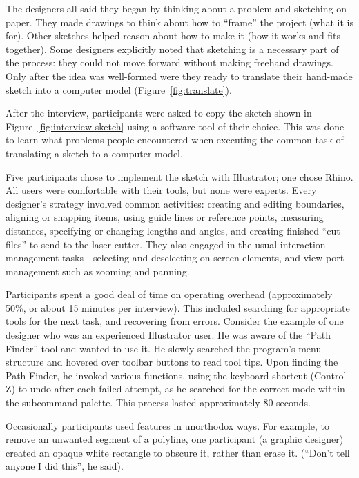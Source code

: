 The designers all said they began by thinking about a problem and
sketching on paper. They made drawings to think about how to ``frame''
the project (what it is for). Other sketches helped reason about how
to make it (how it works and fits together). Some designers explicitly
noted that sketching is a necessary part of the process: they could
not move forward without making freehand drawings. Only after the idea
was well-formed were they ready to translate their hand-made sketch
into a computer model (Figure~\ref{fig:translate}).

After the interview, participants were asked to copy the sketch shown
in Figure~\ref{fig:interview-sketch} using a software tool of their
choice. This was done to learn what problems people encountered when
executing the common task of translating a sketch to a computer model.



Five participants chose to implement the sketch with Illustrator; one
chose Rhino. All users were comfortable with their tools, but none
were experts. Every designer's strategy involved common activities:
creating and editing boundaries, aligning or snapping items, using
guide lines or reference points, measuring distances, specifying or
changing lengths and angles, and creating finished ``cut files'' to
send to the laser cutter. They also engaged in the usual interaction
management tasks---selecting and deselecting on-screen elements, and
view port management such as zooming and panning.

Participants spent a good deal of time on operating overhead
(approximately 50\%, or about 15 minutes per interview). This included
searching for appropriate tools for the next task, and recovering from
errors. Consider the example of one designer who was an experienced
Illustrator user. He was aware of the ``Path Finder'' tool and wanted
to use it. He slowly searched the program's menu structure and hovered
over toolbar buttons to read tool tips. Upon finding the Path Finder,
he invoked various functions, using the keyboard shortcut (Control-Z)
to undo after each failed attempt, as he searched for the correct mode
within the subcommand palette. This process lasted approximately 80
seconds.

Occasionally participants used features in unorthodox ways. For
example, to remove an unwanted segment of a polyline, one participant
(a graphic designer) created an opaque white rectangle to obscure it,
rather than erase it. (``Don't tell anyone I did this'', he said).

